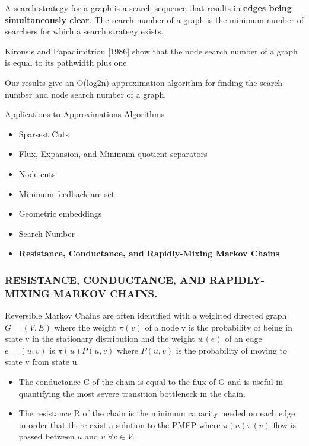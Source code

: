 \begin{frame}
A search strategy for a graph is a search sequence that results in \textbf{
edges being simultaneously clear}. The search number of a graph is the minimum
number of searchers for which a search strategy exists.

Kirousis and Papadimitriou [1986] show that the node search number of a
graph is equal to its pathwidth plus one.  

Our results give an O(log2n)
approximation algorithm for finding the search number and node search number
of a graph.
\end{frame}



\begin{frame}[t]
\begin{block}{Applications to Approximations Algorithms}
	\begin{itemize}
			\item Sparsest Cuts
            \item Flux, Expansion, and Minimum quotient separators
            \item Node cuts
			\item Minimum feedback arc set
            \item Geometric embeddings
        	\item Search Number
            \item \textbf{Resistance, Conductance, and Rapidly-Mixing Markov Chains}
	 \end{itemize} 
\end{block}
\end{frame}

\begin{frame}
\frametitle{RESISTANCE, CONDUCTANCE, AND RAPIDLY-MIXING MARKOV CHAINS.}

Reversible Markov Chains are often identified with a weighted directed graph
$G=(V, E)$ where the weight $\pi(v)$ of a node v is the probability of being in
state v in the stationary distribution and the weight $w(e)$ of an edge $e=(u, v)$ is
$\pi(u)P(u,v)$ where $P(u,v)$ is the probability of moving to state v from state u.
\begin{itemize}
\item The conductance C of the chain is equal to the flux of G and is useful in
quantifying the most severe transition bottleneck in the chain.
\item The resistance R of
the chain is the minimum capacity needed on each edge in order that there exist
a solution to the PMFP where $\pi(u)\pi(v)$ flow is passed between $u$ and $v$ $\forall
v \in V$. 
\end{itemize}
\end{frame}

